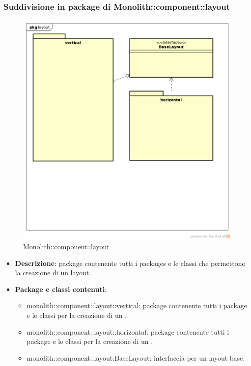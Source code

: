\subsubsection{Suddivisione in package  di Monolith::component::layout}
\label{Monolith::component::layout}
\begin{figure}[H]
	\centering
	\includegraphics[scale=0.5]{Sezioni/imgPackage/component_layout.png}
	\caption{Monolith::component::layout}
\end{figure}
\begin{itemize}
	\item{\textbf{Descrizione}}: package contenente tutti i packages e le classi che permettono la creazione di un layout.
	\item{\textbf{Package e classi contenuti}}:
	\begin{itemize}
	\item{monolith::component::layout::vertical}: package contenente tutti i package e le classi per la creazione di un .
	\item{monolith::component::layout::horizontal}: package contenente tutti i package e le classi per la creazione di un .
	\item{monolith::component::layout:BaseLayout}: interfaccia per un layout base.
	\end{itemize}

\end{itemize}


